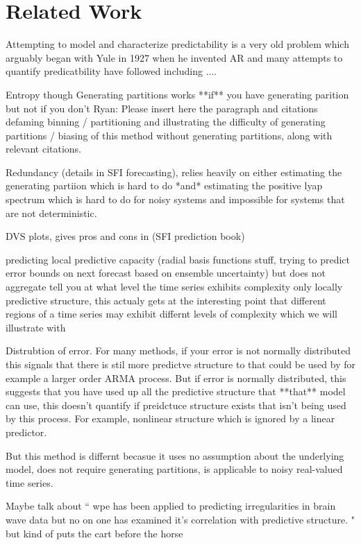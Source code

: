 \section{Related Work}\label{sec:related}

Attempting to model and characterize predictability is a very old problem which arguably began with Yule in 1927 when he invented AR and many attempts to quantify predicatbility have followed including ....

Entropy though Generating partitions 
works **if** you have generating parition but not if you don't
{\color{blue} Ryan: Please insert here the paragraph and citations defaming binning / partitioning and illustrating the difficulty of generating partitions / biasing of this method without generating partitions, along with relevant citations. }


Redundancy (details in SFI forecasting), relies heavily on either estimating the generating partiion which is hard to do *and* estimating the positive lyap spectrum which is hard to do for noisy systems and impossible for systems that are not deterministic. 

DVS plots, gives pros and cons in (SFI prediction book)

predicting local predictive capacity (radial basis functions stuff, trying to predict error bounds on next forecast based on ensemble uncertainty) but does not aggregate tell you at what level the time series exhibits complexity only locally predictive structure, this actualy gets at the interesting point that different regions of a time series may exhibit differnt levels of complexity which we will illustrate with \svd

Distrubtion of error. For many methods, if your error is not normally distributed this signals that there is stil more predictve structure to that could be used by for example a larger order ARMA process. But if error is normally distributed, this suggests that you have used up all the predictive structure that **that** model can use, this doesn't quantify if preidctuce structure exists that isn't being used by this process. For example, nonlinear structure which is ignored by a linear predictor. 


But this method is differnt becasue it uses no assumption about the underlying model, does not require generating partitions, is applicable to noisy real-valued time series. 


Maybe talk about ``
wpe has been applied to predicting irregularities in brain wave data but no on one has examined it's correlation with predictive structure. "
but kind of puts the cart before the horse


